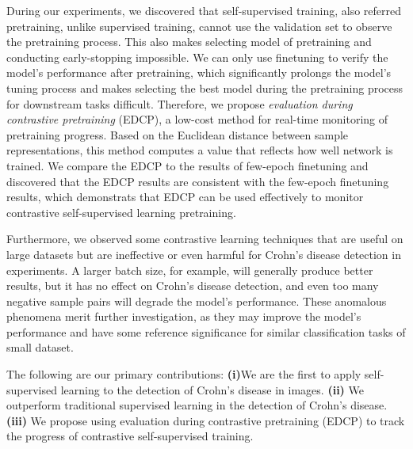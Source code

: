 \documentclass[conference]{IEEEtran}
\begin{document}
During our experiments, we discovered that self-supervised training, also referred pretraining, unlike supervised training, cannot use the validation set to observe the pretraining process. This also makes selecting model of pretraining and conducting early-stopping impossible. We can only use finetuning to verify the model's performance after pretraining, which significantly prolongs the model's tuning process and makes selecting the best model during the pretraining process for downstream tasks difficult.
Therefore, we propose \textit{evaluation during contrastive pretraining} (EDCP), a low-cost method for real-time monitoring of pretraining progress. Based on the Euclidean distance between sample representations, this method computes a value that reflects how well network is trained. We compare the EDCP to the results of few-epoch finetuning and discovered that the EDCP results are consistent with the few-epoch finetuning results, which demonstrats that EDCP can be used effectively to monitor contrastive self-supervised learning pretraining.

Furthermore, we observed some contrastive learning techniques that are useful on large datasets but are ineffective or even harmful for Crohn's disease detection in experiments. A larger batch size, for example, will generally produce better results\cite{SimCLR}, but it has no effect on Crohn's disease detection, and even too many negative sample pairs will degrade the model's performance.
These anomalous phenomena merit further investigation, as they may improve the model's performance and have some reference significance for similar classification tasks of small dataset.

The following are our primary contributions: \textbf{(i)}We are the first to apply self-supervised learning to the detection of Crohn's disease in images. \textbf{(ii)} We outperform traditional supervised learning in the detection of Crohn's disease. \textbf{(iii)} We propose using evaluation during contrastive pretraining (EDCP) to track the progress of contrastive self-supervised training.
\end{document}
